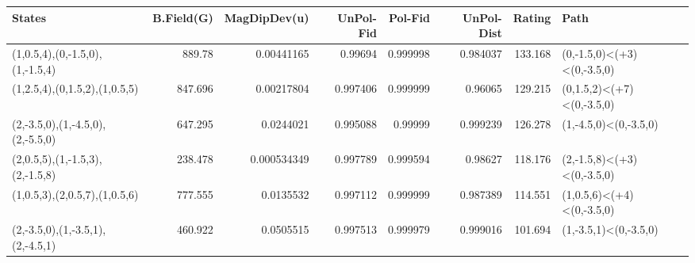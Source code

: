 \begin{tabular}{lrrrrrrl}
\hline
 States                           &   B.Field(G) &   MagDipDev(u) &   UnPol-Fid &   Pol-Fid &   UnPol-Dist &   Rating & Path                       \\
\hline
 (1,0.5,4),(0,-1.5,0),(1,-1.5,4)  &      889.78  &    0.00441165  &    0.99694  &  0.999998 &     0.984037 &  133.168 & (0,-1.5,0)<(+3)<(0,-3.5,0) \\
 (1,2.5,4),(0,1.5,2),(1,0.5,5)    &      847.696 &    0.00217804  &    0.997406 &  0.999999 &     0.96065  &  129.215 & (0,1.5,2)<(+7)<(0,-3.5,0)  \\
 (2,-3.5,0),(1,-4.5,0),(2,-5.5,0) &      647.295 &    0.0244021   &    0.995088 &  0.99999  &     0.999239 &  126.278 & (1,-4.5,0)<(0,-3.5,0)      \\
 (2,0.5,5),(1,-1.5,3),(2,-1.5,8)  &      238.478 &    0.000534349 &    0.997789 &  0.999594 &     0.98627  &  118.176 & (2,-1.5,8)<(+3)<(0,-3.5,0) \\
 (1,0.5,3),(2,0.5,7),(1,0.5,6)    &      777.555 &    0.0135532   &    0.997112 &  0.999999 &     0.987389 &  114.551 & (1,0.5,6)<(+4)<(0,-3.5,0)  \\
 (2,-3.5,0),(1,-3.5,1),(2,-4.5,1) &      460.922 &    0.0505515   &    0.997513 &  0.999979 &     0.999016 &  101.694 & (1,-3.5,1)<(0,-3.5,0)      \\
\hline
\end{tabular}